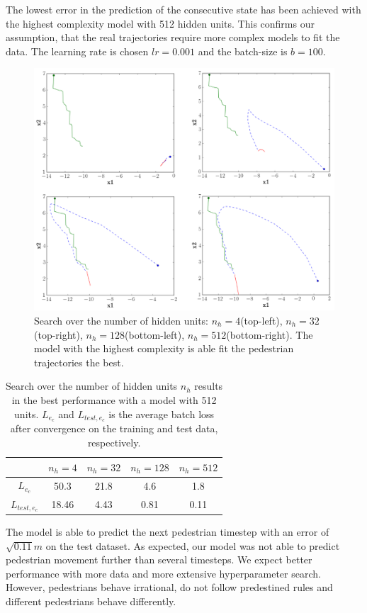 The lowest error in the prediction of the consecutive state has been achieved with the highest complexity model with 512 hidden units. This confirms our assumption, that the real trajectories require more complex models to fit the data. The learning rate is chosen $lr=0.001$ and the batch-size is $b=100$. 

\begin{figure}
	\centering
	\includegraphics [trim=0 0 0 0, clip, angle=0, width=1.0\columnwidth,
	keepaspectratio]{figures/rnn_real_ped}
	\caption{Search over the number of hidden units: $n_h=4$(top-left), $n_h=32$(top-right), $n_h=128$(bottom-left), $n_h=512$(bottom-right). The model with the highest complexity is able fit the pedestrian trajectories the best.}
	\label{fig:rnn_real_ped}
\end{figure}

\begin{table}[]
\centering
\begin{tabular}{ c| c| c| c| c}
& $n_h=4$ & $n_h=32$ &$n_h=128$ & $n_h=512$\\
\hline
$L_{e_c}$		&  50.3	& 21.8	& 4.6 & 1.8 	\\
$L_{test, e_c}$	& 18.46	& 4.43	& 0.81	& 0.11 	\\     
\end{tabular}
\caption{Search over the number of hidden units $n_h$ results in the best performance with a model with 512 units. $L_{e_c}$ and $L_{test, e_c}$ is the average batch loss after convergence on the training and test data, respectively.}
\end{table}

The model is able to predict the next pedestrian timestep with an error of $\sqrt{0.11}m$ on the test dataset. As expected, our model was not able to predict pedestrian movement further than several timesteps. We expect better performance with more data and more extensive hyperparameter search. However, pedestrians behave irrational, do not follow predestined rules and different pedestrians behave differently. 